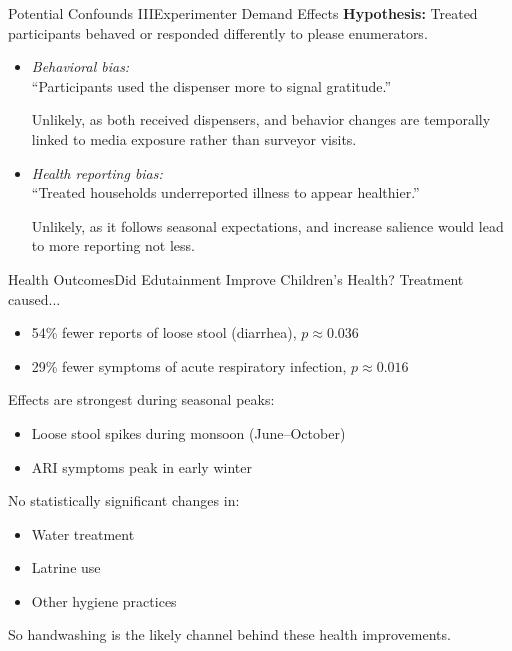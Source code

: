 \documentclass[aspectratio=169]{beamer}
\begin{document}
\begin{frame}{Potential Confounds III}{Experimenter Demand Effects}
	\textbf{Hypothesis:} Treated participants behaved or responded
	differently to please enumerators.

	\begin{itemize}
		\item \textit{Behavioral bias:}\\
			``Participants used the dispenser more to signal
			gratitude.''

			Unlikely, as both received dispensers, and behavior
			changes are temporally linked to media exposure rather
			than surveyor visits.

		\item \textit{Health reporting bias:}\\
			``Treated households underreported illness to appear
			healthier.''

			Unlikely, as it follows seasonal expectations, and
			increase salience would lead to more reporting not
			less.
	\end{itemize}
\end{frame}

\begin{frame}{Health Outcomes}{Did Edutainment Improve Children's Health?}
	Treatment caused...
	\begin{itemize}
		\item 54\% fewer reports of loose stool (diarrhea), $p \approx 0.036$
		\item 29\% fewer symptoms of acute respiratory infection, $p \approx 0.016$
	\end{itemize}


	Effects are strongest during seasonal peaks:
	\begin{itemize}
		\item Loose stool spikes during monsoon (June–October)
		\item ARI symptoms peak in early winter
	\end{itemize}


	No statistically significant changes in:
	\begin{itemize}
		\item Water treatment
		\item Latrine use
		\item Other hygiene practices
	\end{itemize}

	So handwashing is the likely channel behind these health improvements.
\end{frame}
\end{document}
